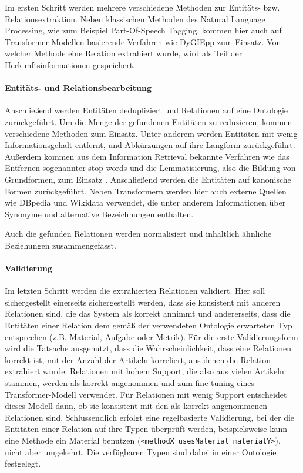 Im ersten Schritt werden mehrere verschiedene Methoden zur Entitäts- bzw. Relationsextraktion.
Neben klassischen Methoden des Natural Language Processing, wie zum Beispiel Part-Of-Speech Tagging, kommen hier auch auf Transformer-Modellen basierende Verfahren wie DyGIEpp \cite{wadden-etal-2019-entity} zum Einsatz.
Von welcher Methode eine Relation extrahiert wurde, wird als Teil der Herkunftsinformationen gespeichert.

\paragraph{Entitäts- und Relationsbearbeitung}

Anschließend werden Entitäten dedupliziert und Relationen auf eine Ontologie zurückgeführt.
Um die Menge der gefundenen Entitäten zu reduzieren, kommen verschiedene Methoden zum Einsatz.
Unter anderem werden Entitäten mit wenig Informationsgehalt entfernt, und Abkürzungen auf ihre Langform zurückgeführt.
Außerdem kommen aus dem Information Retrieval bekannte Verfahren wie das Entfernen sogenannter stop-words und die Lemmatisierung, also die Bildung von Grundformen, zum Einsatz \cite{Ceri2013}.
Anschließend werden die Entitäten auf kanonische Formen zurückgeführt.
Neben Transformern werden hier auch externe Quellen wie DBpedia und Wikidata verwendet, die unter anderem Informationen über Synonyme und alternative Bezeichnungen enthalten.

Auch die gefunden Relationen werden normalisiert und inhaltlich ähnliche Beziehungen zusammengefasst.

\paragraph{Validierung}

Im letzten Schritt werden die extrahierten Relationen validiert.
Hier soll sichergestellt einerseits sichergestellt werden, dass sie konsistent mit anderen Relationen sind, die das System als korrekt annimmt und andererseits, dass die Entitäten einer Relation dem \textemdash gemäß der verwendeten Ontologie \textemdash erwarteten Typ entsprechen (z.B. Material, Aufgabe oder Metrik).
Für die erste Validierungsform wird die Tatsache ausgenutzt, dass die Wahrscheinlichkeit, dass eine Relationen korrekt ist, mit der Anzahl der Artikeln korreliert, aus denen die Relation extrahiert wurde.
Relationen mit hohem Support, die also aus vielen Artikeln stammen, werden als korrekt angenommen und zum fine-tuning eines Transformer-Modell verwendet.
Für Relationen mit wenig Support entscheidet dieses Modell dann, ob sie konsistent mit den als korrekt angenommenen Relationen sind.
Schlussendlich erfolgt eine regelbasierte Validierung, bei der die Entitäten einer Relation auf ihre Typen überprüft werden, beispielsweise kann eine Methode ein Material benutzen (\verb|<methodX usesMaterial materialY>|), nicht aber umgekehrt.
Die verfügbaren Typen sind dabei in einer Ontologie festgelegt.

